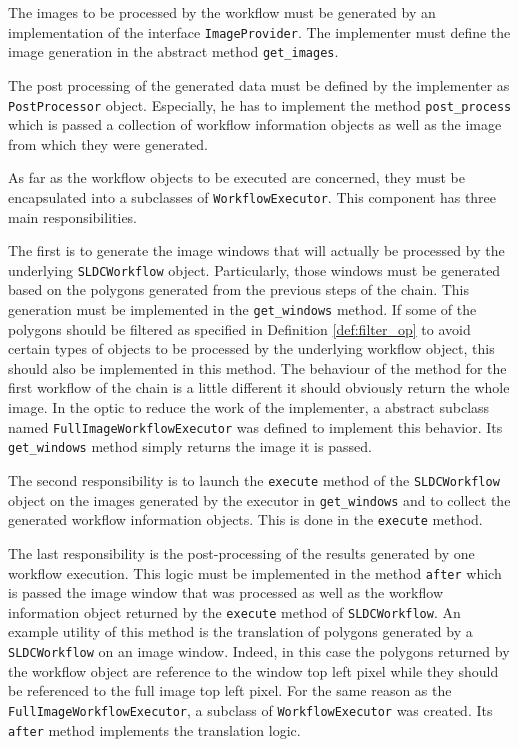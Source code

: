 The images to be processed by the workflow must be generated by an implementation of the interface \texttt{ImageProvider}. The implementer must define the image generation in the abstract method \texttt{get\_images}. 

The post processing of the generated data must be defined by the implementer as \texttt{PostProcessor} object. Especially, he has to implement the method \texttt{post\_process} which is passed a collection of workflow information objects as well as the image from which they were generated.

As far as the workflow objects to be executed are concerned, they must be encapsulated into a subclasses of \texttt{WorkflowExecutor}. This component has three main responsibilities. 

The first is to generate the image windows that will actually be processed by the underlying \texttt{SLDCWorkflow} object. Particularly, those windows must be generated based on the polygons generated from the previous steps of the chain. This generation must be implemented in the \texttt{get\_windows} method. If some of the polygons should be filtered as specified in Definition \ref{def:filter_op} to avoid certain types of objects to be processed by the underlying workflow object, this should also be implemented in this method. The behaviour of the method for the first workflow of the chain is a little different it should obviously return the whole image. In the optic to reduce the work of the implementer, a abstract subclass named \texttt{FullImageWorkflowExecutor} was defined to implement this behavior. Its \texttt{get\_windows} method simply returns the image it is passed. 

The second responsibility is to launch the \texttt{execute} method of the \texttt{SLDCWorkflow} object on the images generated by the executor in \texttt{get\_windows} and to collect the generated workflow information objects. This is done in the \texttt{execute} method. 

The last responsibility is the post-processing of the results generated by one workflow execution. This logic must be implemented in the method \texttt{after} which is passed the image window that was processed as well as the workflow information object returned by the \texttt{execute} method of \texttt{SLDCWorkflow}. An example utility of this method is the translation of polygons generated by a \texttt{SLDCWorkflow} on an image window. Indeed, in this case the polygons returned by the workflow object are reference to the window top left pixel while they should be referenced to the full image top left pixel. For the same reason as the \texttt{FullImageWorkflowExecutor}, a subclass of \texttt{WorkflowExecutor} was created. Its \texttt{after} method implements the translation logic.

